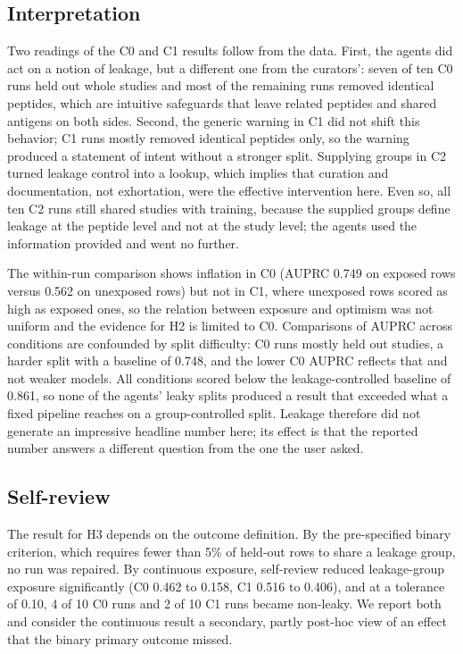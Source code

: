\documentclass[11pt,a4paper]{article}
\begin{document}
\subsection*{Interpretation}
Two readings of the C0 and C1 results follow from the data. First, the agents did act on a notion of leakage, but a different one from the curators': seven of ten C0 runs held out whole studies and most of the remaining runs removed identical peptides, which are intuitive safeguards that leave related peptides and shared antigens on both sides. Second, the generic warning in C1 did not shift this behavior; C1 runs mostly removed identical peptides only, so the warning produced a statement of intent without a stronger split. Supplying groups in C2 turned leakage control into a lookup, which implies that curation and documentation, not exhortation, were the effective intervention here. Even so, all ten C2 runs still shared studies with training, because the supplied groups define leakage at the peptide level and not at the study level; the agents used the information provided and went no further.

The within-run comparison shows inflation in C0 (AUPRC 0.749 on exposed rows versus 0.562 on unexposed rows) but not in C1, where unexposed rows scored as high as exposed ones, so the relation between exposure and optimism was not uniform and the evidence for H2 is limited to C0. Comparisons of AUPRC across conditions are confounded by split difficulty: C0 runs mostly held out studies, a harder split with a baseline of 0.748, and the lower C0 AUPRC reflects that and not weaker models. All conditions scored below the leakage-controlled baseline of 0.861, so none of the agents' leaky splits produced a result that exceeded what a fixed pipeline reaches on a group-controlled split. Leakage therefore did not generate an impressive headline number here; its effect is that the reported number answers a different question from the one the user asked.

\subsection*{Self-review}
The result for H3 depends on the outcome definition. By the pre-specified binary criterion, which requires fewer than 5\% of held-out rows to share a leakage group, no run was repaired. By continuous exposure, self-review reduced leakage-group exposure significantly (C0 0.462 to 0.158, C1 0.516 to 0.406), and at a tolerance of 0.10, 4 of 10 C0 runs and 2 of 10 C1 runs became non-leaky. We report both and consider the continuous result a secondary, partly post-hoc view of an effect that the binary primary outcome missed.
\end{document}

